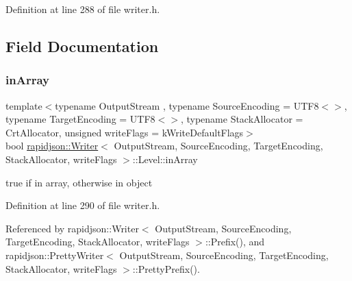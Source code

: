 Definition at line 288 of file writer.\+h.


\begin{DoxyCode}{0}

\end{DoxyCode}


\subsection{Field Documentation}
\mbox{\label{structrapidjson_1_1_writer_1_1_level_a59255e3b1d371161f7c894503cfd6bec}} 
\subsubsection{\texorpdfstring{inArray}{inArray}}
{\footnotesize\ttfamily template$<$typename Output\+Stream , typename Source\+Encoding  = U\+T\+F8$<$$>$, typename Target\+Encoding  = U\+T\+F8$<$$>$, typename Stack\+Allocator  = Crt\+Allocator, unsigned write\+Flags = k\+Write\+Default\+Flags$>$ \\
bool \mbox{\hyperlink{classrapidjson_1_1_writer}{rapidjson\+::\+Writer}}$<$ Output\+Stream, Source\+Encoding, Target\+Encoding, Stack\+Allocator, write\+Flags $>$\+::Level\+::in\+Array}



true if in array, otherwise in object 



Definition at line 290 of file writer.\+h.



Referenced by rapidjson\+::\+Writer$<$ Output\+Stream, Source\+Encoding, Target\+Encoding, Stack\+Allocator, write\+Flags $>$\+::\+Prefix(), and rapidjson\+::\+Pretty\+Writer$<$ Output\+Stream, Source\+Encoding, Target\+Encoding, Stack\+Allocator, write\+Flags $>$\+::\+Pretty\+Prefix().

